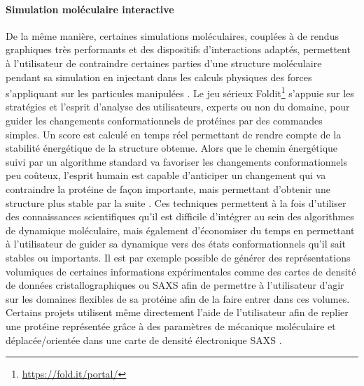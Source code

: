 \paragraph {Simulation moléculaire interactive}

De la même manière, certaines simulations moléculaires, couplées à de rendus graphiques très performants et des dispositifs d'interactions adaptés, permettent à l'utilisateur de contraindre certaines parties d'une structure moléculaire pendant sa simulation en injectant dans les calculs physiques des forces s'appliquant sur les particules manipulées \cite{bolopion_comparing_2010}. Le jeu sérieux Foldit\footnote{\url{https://fold.it/portal/}} s'appuie sur les stratégies et l'esprit d'analyse des utilisateurs, experts ou non du domaine, pour guider les changements conformationnels de protéines par des commandes simples. Un score est calculé en temps réel permettant de rendre compte de la stabilité énergétique de la structure obtenue. Alors que le chemin énergétique suivi par un algorithme standard va favoriser les changements conformationnels peu coûteux, l'esprit humain est capable d'anticiper un changement qui va contraindre la protéine de façon importante, mais permettant d'obtenir une structure plus stable par la suite \cite{khatib2011crystal}.
Ces techniques permettent à la fois d'utiliser des connaissances scientifiques qu'il est difficile d'intégrer au sein des algorithmes de dynamique moléculaire, mais également d'économiser du temps en permettant à l'utilisateur de guider sa dynamique vers des états conformationnels qu'il sait stables
ou importants.
Il est par exemple possible de générer des représentations volumiques de certaines informations expérimentales comme des cartes de densité de données cristallographiques ou SAXS afin de permettre à l'utilisateur d'agir sur les domaines flexibles de sa protéine afin de la faire entrer dans ces volumes. Certains projets utilisent même directement l'aide de l'utilisateur afin de replier une protéine représentée grâce à des paramètres de mécanique moléculaire et déplacée/orientée dans une carte de densité électronique SAXS \cite{molza2014innovative,tek2012advances}.

